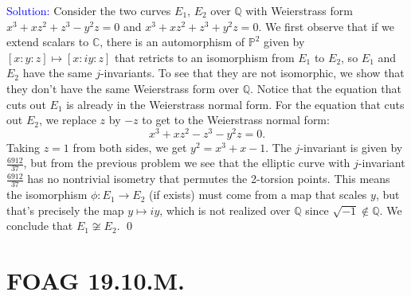 \documentclass[11pt]{article}
\newcommand{\CC}{\mathbb{C}}
\newcommand{\PP}{\mathbb{P}}
\newcommand{\QQ}{\mathbb{Q}}
\newenvironment{solution}{\begin{trivlist}\item[]{\textcolor{blue}{Solution:}}}{\qed \end{trivlist}}
\begin{document}
\begin{solution}
	Consider the two curves $E_1$, $E_2$ over $\QQ$ with Weierstrass form $x^3 + xz^2 + z^3 - y^2z = 0$ and $x^3 + xz^2 + z^3 + y^2z = 0$. We first observe that if we extend scalars to $\CC$, there is an automorphism of $\PP^2$ given by $[x:y:z] \mapsto [x:iy:z]$ that retricts to an isomorphism from $E_1$ to $E_2$, so $E_1$ and $E_2$ have the same $j$-invariants. 
	To see that they are not isomorphic, we show that they don't have the same Weierstrass form over $\QQ$. Notice that the equation that cuts out $E_1$ is already in the Weierstrass normal form. For the equation that cuts out $E_2$, we replace $z$ by $-z$ to get to the Weierstrass normal form:
	\[
		x^3 + xz^2 - z^3 - y^2z = 0.
	\]
	Taking $z = 1$ from both sides, we get $y^2 = x^3 + x - 1$. The $j$-invariant is given by $\frac{6912}{37}$, but from the previous problem we see that the elliptic curve with $j$-invariant $\frac{6912}{37}$ has no nontrivial isometry that permutes the 2-torsion points. This means the isomorphism $\phi: E_1 \rightarrow E_2$ (if exists) must come from a map that scales $y$, but that's precisely the map $y \mapsto iy$, which is not realized over $\QQ$ since $\sqrt{-1} \not\in \QQ$. We conclude that $E_1 \not\cong E_2$. 
\end{solution}

\newpage

\section*{FOAG 19.10.M.}
\end{document}
